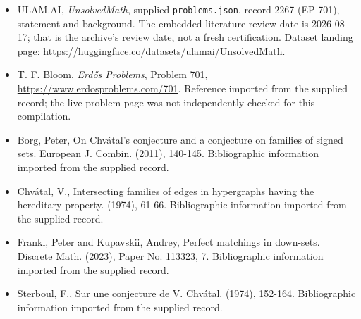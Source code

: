 \documentclass[11pt,a4paper]{article}
\begin{document}
{\small

\begin{itemize}

\item[\hypertarget{source:2267:1}{S1}] ULAM.AI, \emph{UnsolvedMath}, supplied \texttt{problems.json}, record 2267 (EP-701), statement and background. The embedded literature-review date is 2026-08-17; that is the archive’s review date, not a fresh certification. Dataset landing page: \url{https://huggingface.co/datasets/ulamai/UnsolvedMath}.

\item[\hypertarget{source:2267:2}{S2}] T. F. Bloom, \emph{Erdős Problems}, Problem 701, \url{https://www.erdosproblems.com/701}. Reference imported from the supplied record; the live problem page was not independently checked for this compilation.

\item[\hypertarget{source:2267:3}{S3}] Borg, Peter, On Chv\'{a}tal's conjecture and a conjecture on families of signed sets. European J. Combin. (2011), 140-145. Bibliographic information imported from the supplied record.

\item[\hypertarget{source:2267:4}{S4}] Chv\'{a}tal, V., Intersecting families of edges in hypergraphs having the hereditary property. (1974), 61-66. Bibliographic information imported from the supplied record.

\item[\hypertarget{source:2267:5}{S5}] Frankl, Peter and Kupavskii, Andrey, Perfect matchings in down-sets. Discrete Math. (2023), Paper No. 113323, 7. Bibliographic information imported from the supplied record.

\item[\hypertarget{source:2267:6}{S6}] Sterboul, F., Sur une conjecture de V. Chv\'{a}tal. (1974), 152-164. Bibliographic information imported from the supplied record.

\end{itemize}

}

\label{end:2267}
\end{document}
